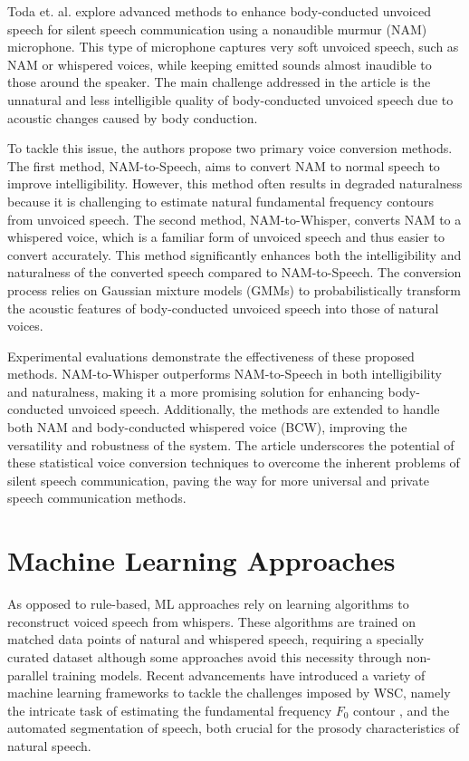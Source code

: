 Toda et. al. \cite{todaStatisticalVoiceConversion2012} explore advanced methods to enhance body-conducted unvoiced speech for silent speech communication using a nonaudible murmur (NAM) microphone. This type of microphone captures very soft unvoiced speech, such as NAM or whispered voices, while keeping emitted sounds almost inaudible to those around the speaker. The main challenge addressed in the article is the unnatural and less intelligible quality of body-conducted unvoiced speech due to acoustic changes caused by body conduction.

To tackle this issue, the authors propose two primary voice conversion methods. The first method, NAM-to-Speech, aims to convert NAM to normal speech to improve intelligibility. However, this method often results in degraded naturalness because it is challenging to estimate natural fundamental frequency contours from unvoiced speech. The second method, NAM-to-Whisper, converts NAM to a whispered voice, which is a familiar form of unvoiced speech and thus easier to convert accurately. This method significantly enhances both the intelligibility and naturalness of the converted speech compared to NAM-to-Speech. The conversion process relies on Gaussian mixture models (GMMs) to probabilistically transform the acoustic features of body-conducted unvoiced speech into those of natural voices.

Experimental evaluations demonstrate the effectiveness of these proposed methods. NAM-to-Whisper outperforms NAM-to-Speech in both intelligibility and naturalness, making it a more promising solution for enhancing body-conducted unvoiced speech. Additionally, the methods are extended to handle both NAM and body-conducted whispered voice (BCW), improving the versatility and robustness of the system. The article underscores the potential of these statistical voice conversion techniques to overcome the inherent problems of silent speech communication, paving the way for more universal and private speech communication methods.

%
%

\section{Machine Learning Approaches}

As opposed to rule-based, ML approaches rely on learning algorithms to reconstruct voiced speech from whispers. These algorithms are trained on matched data points of natural and whispered speech, requiring a specially curated dataset although some approaches avoid this necessity through non-parallel training models. Recent advancements have introduced a variety of machine learning frameworks to tackle the challenges imposed by WSC, namely the intricate task of estimating the fundamental frequency $F_0$ contour \cite{oliveiraMachineLearningApproaches2022}, and the automated segmentation of speech, both crucial for the prosody characteristics of natural speech. 


